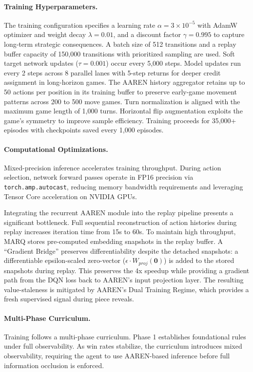 \paragraph{Training Hyperparameters.}
The training configuration specifies a learning rate $\alpha = 3 \times 10^{-5}$ with AdamW optimizer and weight decay $\lambda = 0.01$, and a discount factor $\gamma = 0.995$ to capture long-term strategic consequences. A batch size of 512 transitions and a replay buffer capacity of 150,000 transitions with prioritized sampling are used. Soft target network updates ($\tau = 0.001$) occur every 5,000 steps. Model updates run every 2 steps across 8 parallel lanes with 5-step returns for deeper credit assignment in long-horizon games. The AAREN history aggregator retains up to 50 actions per position in its training buffer to preserve early-game movement patterns across 200 to 500 move games. Turn normalization is aligned with the maximum game length of 1,000 turns. Horizontal flip augmentation exploits the game's symmetry to improve sample efficiency. Training proceeds for 35,000+ episodes with checkpoints saved every 1,000 episodes.

\paragraph{Computational Optimizations.}
Mixed-precision inference accelerates training throughput. During action selection, network forward passes operate in FP16 precision via \texttt{torch.amp.autocast}, reducing memory bandwidth requirements and leveraging Tensor Core acceleration on NVIDIA GPUs.

Integrating the recurrent AAREN module into the replay pipeline presents a significant bottleneck. Full sequential reconstruction of action histories during replay increases iteration time from 15s to 60s. To maintain high throughput, MARQ stores pre-computed embedding snapshots in the replay buffer. A ``Gradient Bridge'' preserves differentiability despite the detached snapshots: a differentiable epsilon-scaled zero-vector ($\epsilon \cdot W_{proj}(\mathbf{0})$) is added to the stored snapshots during replay. This preserves the 4x speedup while providing a gradient path from the DQN loss back to AAREN's input projection layer. The resulting value-staleness is mitigated by AAREN's Dual Training Regime, which provides a fresh supervised signal during piece reveals.

\paragraph{Multi-Phase Curriculum.}
Training follows a multi-phase curriculum. Phase 1 establishes foundational rules under full observability. As win rates stabilize, the curriculum introduces mixed observability, requiring the agent to use AAREN-based inference before full information occlusion is enforced.

